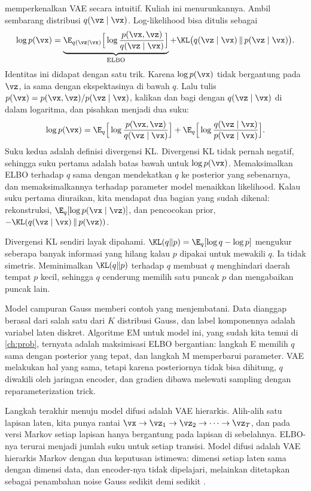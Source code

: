  memperkenalkan VAE secara intuitif. Kuliah ini menurunkannya. Ambil sembarang
distribusi $q(\vz\mid\vx)$. Log-likelihood bisa ditulis sebagai
\begin{equation}
\log p(\vx)=\underbrace{\E_{q(\vz\mid\vx)}\Big[\log\frac{p(\vx,\vz)}{q(\vz\mid\vx)}\Big]}_{\mathrm{ELBO}}
+\KL\big(q(\vz\mid\vx)\,\|\,p(\vz\mid\vx)\big).
\end{equation}
Identitas ini didapat dengan satu trik. Karena $\log p(\vx)$ tidak bergantung pada $\vz$, ia sama dengan
ekspektasinya di bawah $q$. Lalu tulis $p(\vx)=p(\vx,\vz)/p(\vz\mid\vx)$, kalikan dan bagi dengan $q(\vz\mid\vx)$
di dalam logaritma, dan pisahkan menjadi dua suku:
\[
\log p(\vx)=\E_q\Big[\log\frac{p(\vx,\vz)}{q(\vz\mid\vx)}\Big]+\E_q\Big[\log\frac{q(\vz\mid\vx)}{p(\vz\mid\vx)}\Big].
\]
Suku kedua adalah definisi divergensi KL. Divergensi KL tidak pernah negatif, sehingga suku pertama
adalah batas bawah untuk $\log p(\vx)$.
Memaksimalkan ELBO terhadap $q$ sama dengan mendekatkan $q$ ke posterior yang sebenarnya, dan
memaksimalkannya terhadap parameter model menaikkan likelihood. Kalau suku pertama diuraikan, kita
mendapat dua bagian yang sudah dikenal: rekonstruksi, $\E_q[\log p(\vx\mid\vz)]$, dan pencocokan
prior, $-\KL(q(\vz\mid\vx)\,\|\,p(\vz))$.

Divergensi KL sendiri layak dipahami. $\KL(q\|p)=\E_q[\log q-\log p]$ mengukur seberapa banyak
informasi yang hilang kalau $p$ dipakai untuk mewakili $q$. Ia tidak simetris. Meminimalkan
$\KL(q\|p)$ terhadap $q$ membuat $q$ menghindari daerah tempat $p$ kecil, sehingga $q$ cenderung
memilih satu puncak $p$ dan mengabaikan puncak lain.

Model campuran Gauss memberi contoh yang menjembatani. Data dianggap berasal dari salah satu dari
$K$ distribusi Gauss, dan label komponennya adalah variabel laten diskret. Algoritme EM untuk
model ini, yang sudah kita temui di \cref{ch:prob}, ternyata adalah maksimisasi ELBO bergantian:
langkah E memilih $q$ sama dengan posterior yang tepat, dan langkah M memperbarui parameter.
VAE melakukan hal yang sama, tetapi karena posteriornya tidak bisa dihitung, $q$ diwakili oleh
jaringan encoder, dan gradien dibawa melewati sampling dengan reparameterization trick.

Langkah terakhir menuju model difusi adalah VAE hierarkis. Alih-alih satu lapisan laten,
kita punya rantai $\vx\to\vz_1\to\vz_2\to\cdots\to\vz_T$, dan pada versi Markov setiap lapisan hanya
bergantung pada lapisan di sebelahnya. ELBO-nya terurai menjadi jumlah suku untuk setiap transisi.
Model difusi adalah VAE hierarkis Markov dengan dua keputusan istimewa: dimensi setiap laten sama
dengan dimensi data, dan encoder-nya tidak dipelajari, melainkan ditetapkan sebagai penambahan noise
Gauss sedikit demi sedikit \citep{luo2022}.

